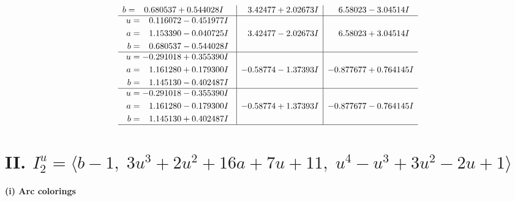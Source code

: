 \documentclass[1p]{elsarticle_modified}
\theoremstyle{definition}
\begin{document}
$$\begin{array}{c|c|c}
\begin{aligned}
b &= \phantom{-}0.680537 + 0.544028 I\end{aligned}
 & \phantom{-}3.42477 + 2.02673 I & \phantom{-}6.58023 - 3.04514 I \\ \hline\begin{aligned}
u &= \phantom{-}0.116072 - 0.451977 I \\
a &= \phantom{-}1.153390 - 0.040725 I \\
b &= \phantom{-}0.680537 - 0.544028 I\end{aligned}
 & \phantom{-}3.42477 - 2.02673 I & \phantom{-}6.58023 + 3.04514 I \\ \hline\begin{aligned}
u &= -0.291018 + 0.355390 I \\
a &= \phantom{-}1.161280 + 0.179300 I \\
b &= \phantom{-}1.145130 - 0.402487 I\end{aligned}
 & -0.58774 - 1.37393 I & -0.877677 + 0.764145 I \\ \hline\begin{aligned}
u &= -0.291018 - 0.355390 I \\
a &= \phantom{-}1.161280 - 0.179300 I \\
b &= \phantom{-}1.145130 + 0.402487 I\end{aligned}
 & -0.58774 + 1.37393 I & -0.877677 - 0.764145 I\\
 \hline 
 \end{array}$$\newpage\newpage\renewcommand{\arraystretch}{1}
\centering \section*{II. $I^u_{2}= \langle b-1,\;3 u^3+2 u^2+16 a+7 u+11,\;u^4- u^3+3 u^2-2 u+1 \rangle$}
\flushleft \textbf{(i) Arc colorings}\\
\end{document}
